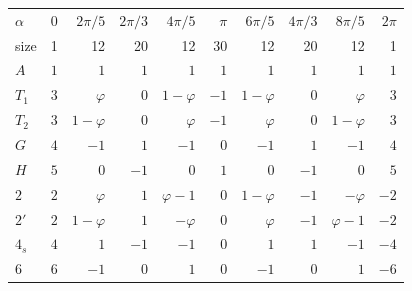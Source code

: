 \begin{tabular}{lrrrrrrrrr}
\hline
$\alpha$ & $0$ & $2\pi/5$ & $2\pi/3$ & $4\pi/5$ & $\pi$ & $6\pi/5$ & $4\pi/3$ & $8\pi/5$ & $2\pi$ \\
size & 1 & 12 & 20 & 12 & 30 & 12 & 20 & 12 & 1 \\
\hline
$A$ & $1$ & $1$ & $1$ & $1$ & $1$ & $1$ & $1$ & $1$ & $1$ \\
$T_1$ & $3$ & $\varphi$ & $0$ & $1 - \varphi$ & $-1$ & $1 - \varphi$ & $0$ & $\varphi$ & $3$ \\
$T_2$ & $3$ & $1 - \varphi$ & $0$ & $\varphi$ & $-1$ & $\varphi$ & $0$ & $1 - \varphi$ & $3$ \\
$G$ & $4$ & $-1$ & $1$ & $-1$ & $0$ & $-1$ & $1$ & $-1$ & $4$ \\
$H$ & $5$ & $0$ & $-1$ & $0$ & $1$ & $0$ & $-1$ & $0$ & $5$ \\
\hline
$2$ & $2$ & $\varphi$ & $1$ & $\varphi - 1$ & $0$ & $1 - \varphi$ & $-1$ & $-\varphi$ & $-2$ \\
$2'$ & $2$ & $1 - \varphi$ & $1$ & $-\varphi$ & $0$ & $\varphi$ & $-1$ & $\varphi - 1$ & $-2$ \\
$4_s$ & $4$ & $1$ & $-1$ & $-1$ & $0$ & $1$ & $1$ & $-1$ & $-4$ \\
$6$ & $6$ & $-1$ & $0$ & $1$ & $0$ & $-1$ & $0$ & $1$ & $-6$ \\
\hline
\end{tabular}
